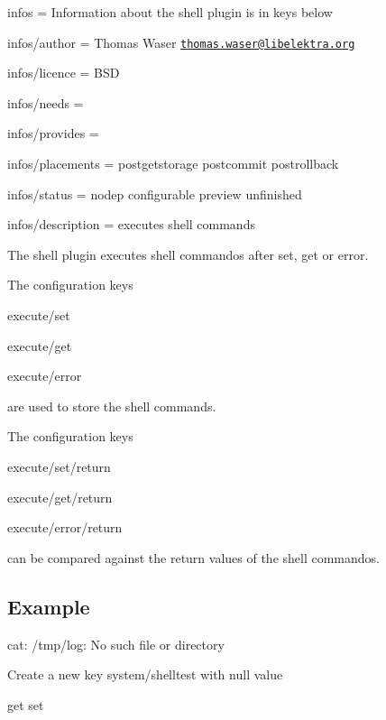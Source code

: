 
\begin{DoxyItemize}
\item infos = Information about the shell plugin is in keys below
\item infos/author = Thomas Waser \href{mailto:thomas.waser@libelektra.org}{\tt thomas.\+waser@libelektra.\+org}
\item infos/licence = B\+SD
\item infos/needs =
\item infos/provides =
\item infos/placements = postgetstorage postcommit postrollback
\item infos/status = nodep configurable preview unfinished
\item infos/description = executes shell commands
\end{DoxyItemize}

The shell plugin executes shell commandos after set, get or error.

The configuration keys


\begin{DoxyItemize}
\item {\ttfamily execute/set}
\item {\ttfamily execute/get}
\item {\ttfamily execute/error}
\end{DoxyItemize}

are used to store the shell commands.

The configuration keys


\begin{DoxyItemize}
\item {\ttfamily execute/set/return}
\item {\ttfamily execute/get/return}
\item {\ttfamily execute/error/return}
\end{DoxyItemize}

can be compared against the return values of the shell commandos.

\subsection*{Example}

\begin{DoxyVerb}%
cat: /tmp/log: No such file or directory


Create a new key system/shelltest with null value

get
set\end{DoxyVerb}
 